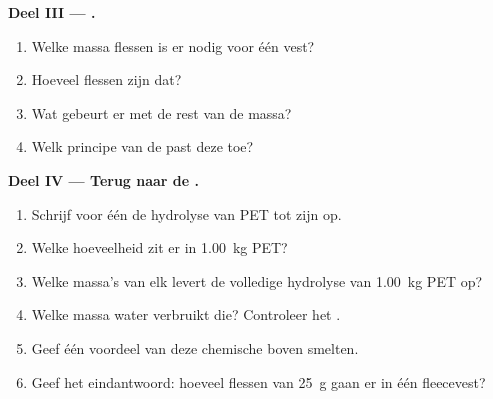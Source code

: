 \begin{problem}
\medskip
\noindent\textbf{Deel III --- .}
\begin{enumerate}[resume]
  \item Welke massa flessen is er nodig voor één vest?
  \item Hoeveel flessen zijn dat?
  \item Wat gebeurt er met de rest van de massa?
  \item Welk principe van de  past deze  toe?
\end{enumerate}

\medskip
\noindent\textbf{Deel IV --- Terug naar de .}
\begin{enumerate}[resume]
  \item Schrijf voor één  de hydrolyse van PET tot zijn
         op.
  \item Welke hoeveelheid  zit er in \qty{1.00}{kg}
        PET?
  \item Welke massa's van elk  levert de volledige hydrolyse van
        \qty{1.00}{kg} PET op?
  \item Welke massa water verbruikt die? Controleer het .
  \item Geef één voordeel van deze chemische  boven smelten.
  \item Geef het eindantwoord: hoeveel flessen van \qty{25}{g} gaan er in
        één fleecevest?
\end{enumerate}
\end{problem}
